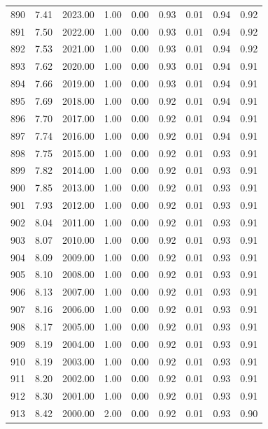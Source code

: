 \documentclass{article}\usepackage[]{graphicx}\usepackage[]{color}
\begin{document}
\begin{longtable}{rrrrrrrrr}
  890 & 7.41 & 2023.00 & 1.00 & 0.00 & 0.93 & 0.01 & 0.94 & 0.92 \\ 
  891 & 7.50 & 2022.00 & 1.00 & 0.00 & 0.93 & 0.01 & 0.94 & 0.92 \\ 
  892 & 7.53 & 2021.00 & 1.00 & 0.00 & 0.93 & 0.01 & 0.94 & 0.92 \\ 
  893 & 7.62 & 2020.00 & 1.00 & 0.00 & 0.93 & 0.01 & 0.94 & 0.91 \\ 
  894 & 7.66 & 2019.00 & 1.00 & 0.00 & 0.93 & 0.01 & 0.94 & 0.91 \\ 
  895 & 7.69 & 2018.00 & 1.00 & 0.00 & 0.92 & 0.01 & 0.94 & 0.91 \\ 
  896 & 7.70 & 2017.00 & 1.00 & 0.00 & 0.92 & 0.01 & 0.94 & 0.91 \\ 
  897 & 7.74 & 2016.00 & 1.00 & 0.00 & 0.92 & 0.01 & 0.94 & 0.91 \\ 
  898 & 7.75 & 2015.00 & 1.00 & 0.00 & 0.92 & 0.01 & 0.93 & 0.91 \\ 
  899 & 7.82 & 2014.00 & 1.00 & 0.00 & 0.92 & 0.01 & 0.93 & 0.91 \\ 
  900 & 7.85 & 2013.00 & 1.00 & 0.00 & 0.92 & 0.01 & 0.93 & 0.91 \\ 
  901 & 7.93 & 2012.00 & 1.00 & 0.00 & 0.92 & 0.01 & 0.93 & 0.91 \\ 
  902 & 8.04 & 2011.00 & 1.00 & 0.00 & 0.92 & 0.01 & 0.93 & 0.91 \\ 
  903 & 8.07 & 2010.00 & 1.00 & 0.00 & 0.92 & 0.01 & 0.93 & 0.91 \\ 
  904 & 8.09 & 2009.00 & 1.00 & 0.00 & 0.92 & 0.01 & 0.93 & 0.91 \\ 
  905 & 8.10 & 2008.00 & 1.00 & 0.00 & 0.92 & 0.01 & 0.93 & 0.91 \\ 
  906 & 8.13 & 2007.00 & 1.00 & 0.00 & 0.92 & 0.01 & 0.93 & 0.91 \\ 
  907 & 8.16 & 2006.00 & 1.00 & 0.00 & 0.92 & 0.01 & 0.93 & 0.91 \\ 
  908 & 8.17 & 2005.00 & 1.00 & 0.00 & 0.92 & 0.01 & 0.93 & 0.91 \\ 
  909 & 8.19 & 2004.00 & 1.00 & 0.00 & 0.92 & 0.01 & 0.93 & 0.91 \\ 
  910 & 8.19 & 2003.00 & 1.00 & 0.00 & 0.92 & 0.01 & 0.93 & 0.91 \\ 
  911 & 8.20 & 2002.00 & 1.00 & 0.00 & 0.92 & 0.01 & 0.93 & 0.91 \\ 
  912 & 8.30 & 2001.00 & 1.00 & 0.00 & 0.92 & 0.01 & 0.93 & 0.91 \\ 
  913 & 8.42 & 2000.00 & 2.00 & 0.00 & 0.92 & 0.01 & 0.93 & 0.90 \\ 

\end{longtable}
\end{document}
